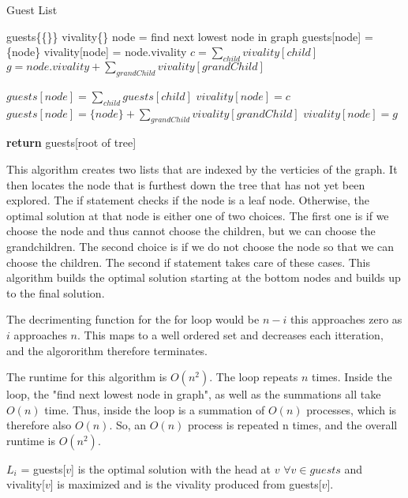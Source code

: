\documentclass{article}
\begin{document}
\begin{algorithm}
    \caption{Guest List}\label{guests}
    \begin{algorithmic}[1]
        \State guests\{\{\}\}
        \State vivality\{\}
			\State node = find next lowest node in graph
				\State guests[node] = \{node\}
				\State vivality[node] = node.vivality
			\Else
				\State $c = \sum_{child} vivality[child]$
				\State $g = node.vivality + \sum_{grandChild} vivality[grandChild]$

					\State $guests[node] = \sum_{child} guests[child]$
					\State $vivality[node] = c$
				\Else
					\State $guests[node] = \{node\} + \sum_{grandChild} vivality[grandChild]$
					\State $vivality[node] = g$
				\EndIf
			\EndIf
		\EndFor

       \State \textbf{return} guests[root of tree]

    \EndFunction
    \end{algorithmic}
\end{algorithm}

This algorithm creates two lists that are indexed by the verticies of the graph. It then locates the node that is furthest down the tree that has not yet been explored. The if statement checks if the node is a leaf node. Otherwise, the optimal solution at that node is either one of two choices. The first one is if we choose the node and thus cannot choose the children, but we can choose the grandchildren. The second choice is if we do not choose the node so that we can choose the children. The second if statement takes care of these cases. This algorithm builds the optimal solution starting at the bottom nodes and builds up to the final solution.

The decrimenting function for the for loop would be $n - i$ this approaches zero as $i$
 approaches $n$. This maps to a well ordered set and decreases each itteration, and the algororithm therefore terminates.
 
 The runtime for this algorithm is $O(n^2)$. The loop repeats $n$ times. Inside the loop, the "find next lowest node in graph", as well as the summations all take $O(n)$ time. Thus, inside the loop is a summation of $O(n)$ processes, which is therefore also $O(n)$. So, an $O(n)$ process is repeated n times, and the overall runtime is $O(n^2)$.
 

 $L_i$ = guests[$v$] is the optimal solution with the head at $v$ $\forall v \in guests$ and vivality[$v$] is maximized and is the vivality produced from guests[$v$].
 
\end{document}
